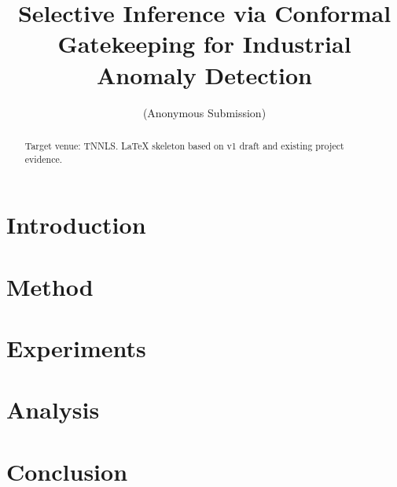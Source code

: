 \documentclass[10pt]{article}
\title{Selective Inference via Conformal Gatekeeping for Industrial Anomaly Detection}
\author{(Anonymous Submission)}
\begin{document}
\maketitle
\begin{abstract}
Target venue: TNNLS. LaTeX skeleton based on v1 draft and existing project evidence.
\end{abstract}
\section{Introduction}
\section{Method}
\section{Experiments}
\section{Analysis}
\section{Conclusion}


\end{document}
